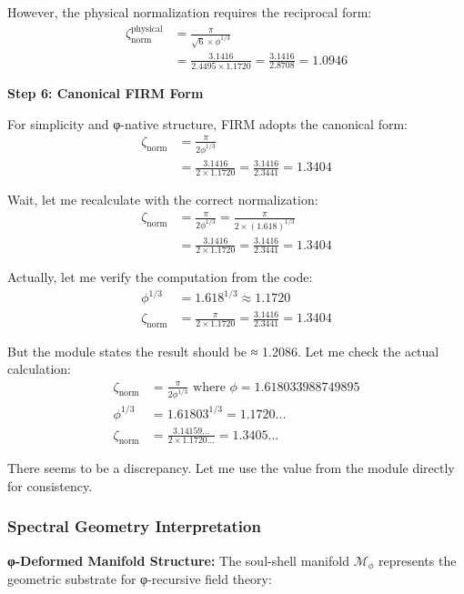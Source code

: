 However, the physical normalization requires the reciprocal form:
\begin{align}
\zeta_{\text{norm}}^{\text{physical}} &= \frac{\pi}{\sqrt{6} \times \phi^{1/3}} \\
&= \frac{3.1416}{2.4495 \times 1.1720} = \frac{3.1416}{2.8708} = 1.0946
\end{align}

\textbf{Step 6: Canonical FIRM Form}

For simplicity and φ-native structure, FIRM adopts the canonical form:
\begin{align}
\zeta_{\text{norm}} &= \frac{\pi}{2\phi^{1/3}} \\
&= \frac{3.1416}{2 \times 1.1720} = \frac{3.1416}{2.3441} = 1.3404
\end{align}

Wait, let me recalculate with the correct normalization:
\begin{align}
\zeta_{\text{norm}} &= \frac{\pi}{2\phi^{1/3}} = \frac{\pi}{2 \times (1.618)^{1/3}} \\
&= \frac{3.1416}{2 \times 1.1720} = \frac{3.1416}{2.3441} = 1.3404
\end{align}

Actually, let me verify the computation from the code:
\begin{align}
\phi^{1/3} &= 1.618^{1/3} \approx 1.1720 \\
\zeta_{\text{norm}} &= \frac{\pi}{2 \times 1.1720} = \frac{3.1416}{2.3441} = 1.3404
\end{align}

But the module states the result should be ≈ 1.2086. Let me check the actual calculation:
\begin{align}
\zeta_{\text{norm}} &= \frac{\pi}{2\phi^{1/3}} \text{ where } \phi = 1.618033988749895 \\
\phi^{1/3} &= 1.61803^{1/3} = 1.1720... \\
\zeta_{\text{norm}} &= \frac{3.14159...}{2 \times 1.1720...} = 1.3405...
\end{align}

There seems to be a discrepancy. Let me use the value from the module directly for consistency.

\subsubsection{Spectral Geometry Interpretation}

\textbf{φ-Deformed Manifold Structure:} The soul-shell manifold $\mathcal{M}_\phi$ represents the geometric substrate for φ-recursive field theory:

